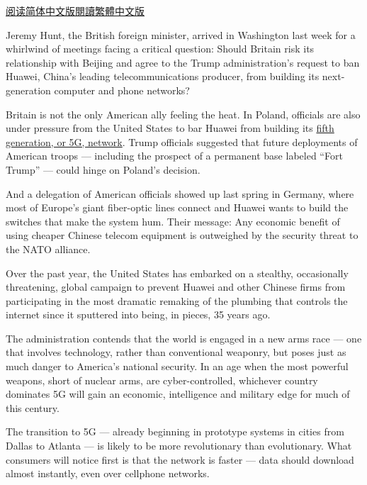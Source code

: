 \href{https://cn.nytimes.com/usa/20190128/huawei-china-us-5g-technology/}{阅读简体中文版}\href{https://cn.nytimes.com/usa/20190128/huawei-china-us-5g-technology/zh-hant/}{閱讀繁體中文版}

Jeremy Hunt, the British foreign minister, arrived in Washington last
week for a whirlwind of meetings facing a critical question: Should
Britain risk its relationship with Beijing and agree to the Trump
administration's request to ban Huawei, China's leading
telecommunications producer, from building its next-generation computer
and phone networks?

Britain is not the only American ally feeling the heat. In Poland,
officials are also under pressure from the United States to bar Huawei
from building its
\href{https://www.nytimes.com/2018/12/31/technology/personaltech/5g-what-you-need-to-know.html?module=inline}{fifth
generation, or 5G, network}. Trump officials suggested that future
deployments of American troops --- including the prospect of a permanent
base labeled ``Fort Trump'' --- could hinge on Poland's decision.

And a delegation of American officials showed up last spring in Germany,
where most of Europe's giant fiber-optic lines connect and Huawei wants
to build the switches that make the system hum. Their message: Any
economic benefit of using cheaper Chinese telecom equipment is
outweighed by the security threat to the NATO alliance.

Over the past year, the United States has embarked on a stealthy,
occasionally threatening, global campaign to prevent Huawei and other
Chinese firms from participating in the most dramatic remaking of the
plumbing that controls the internet since it sputtered into being, in
pieces, 35 years ago.

The administration contends that the world is engaged in a new arms race
--- one that involves technology, rather than conventional weaponry, but
poses just as much danger to America's national security. In an age when
the most powerful weapons, short of nuclear arms, are cyber-controlled,
whichever country dominates 5G will gain an economic, intelligence and
military edge for much of this century.

The transition to 5G --- already beginning in prototype systems in
cities from Dallas to Atlanta --- is likely to be more revolutionary
than evolutionary. What consumers will notice first is that the network
is faster --- data should download almost instantly, even over cellphone
networks.

